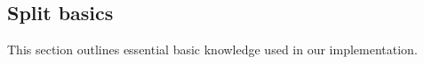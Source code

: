 \subsection{Split basics} \label{sec:split basics}
This section outlines essential basic knowledge used in our implementation.





